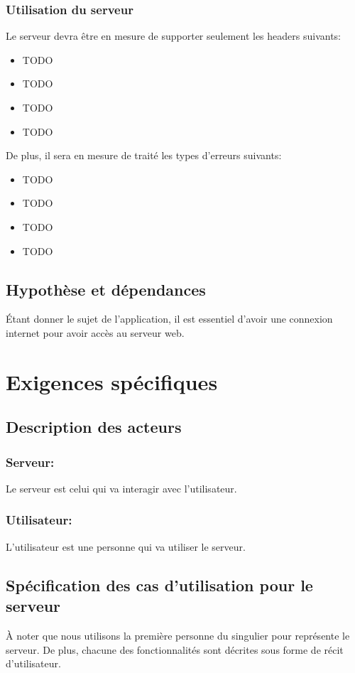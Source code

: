 \documentclass{scrreprt}
\begin{document}
\subsection{Utilisation du serveur}
Le serveur devra être en mesure de supporter seulement les headers suivants: 
\begin{itemize}
 \item TODO
 \item TODO
 \item TODO
 \item TODO
\end{itemize}
 
 De plus, il sera en mesure de traité les types d'erreurs suivants:
 \begin{itemize}
 \item TODO
 \item TODO
 \item TODO
 \item TODO
 \end{itemize}

 
    
\section{Hypothèse et dépendances}
Étant donner le sujet de l'application, il est essentiel d'avoir une connexion internet pour avoir accès au serveur web.\\


\chapter{Exigences spécifiques}

\section{Description des acteurs}
\subsection{Serveur:} Le serveur est celui qui va interagir avec l'utilisateur. 
\subsection{Utilisateur:} L'utilisateur est une personne qui va utiliser le serveur.

\section{Spécification des cas d'utilisation pour le serveur} 
À noter que nous utilisons la première personne du singulier pour représente le serveur. De plus, chacune des fonctionnalités sont décrites sous forme de récit d'utilisateur.
\end{document}
